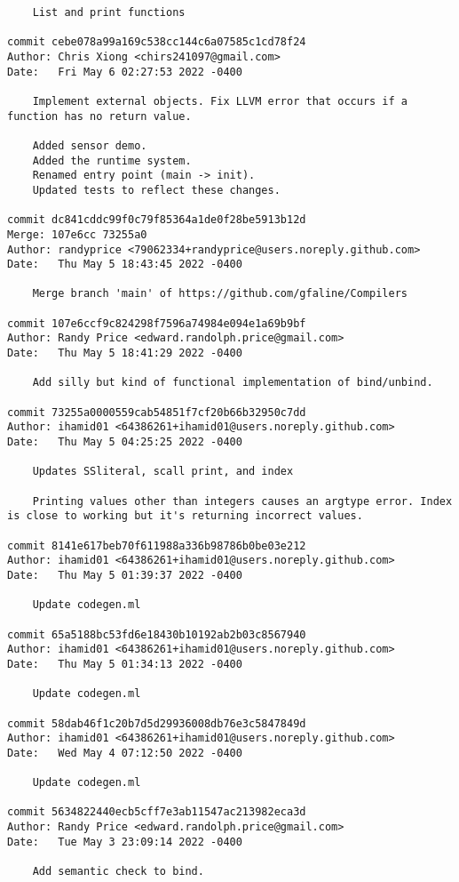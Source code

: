 {\begin{verbatim}
    List and print functions

commit cebe078a99a169c538cc144c6a07585c1cd78f24
Author: Chris Xiong <chirs241097@gmail.com>
Date:   Fri May 6 02:27:53 2022 -0400

    Implement external objects. Fix LLVM error that occurs if a function has no return value.
    
    Added sensor demo.
    Added the runtime system.
    Renamed entry point (main -> init).
    Updated tests to reflect these changes.

commit dc841cddc99f0c79f85364a1de0f28be5913b12d
Merge: 107e6cc 73255a0
Author: randyprice <79062334+randyprice@users.noreply.github.com>
Date:   Thu May 5 18:43:45 2022 -0400

    Merge branch 'main' of https://github.com/gfaline/Compilers

commit 107e6ccf9c824298f7596a74984e094e1a69b9bf
Author: Randy Price <edward.randolph.price@gmail.com>
Date:   Thu May 5 18:41:29 2022 -0400

    Add silly but kind of functional implementation of bind/unbind.

commit 73255a0000559cab54851f7cf20b66b32950c7dd
Author: ihamid01 <64386261+ihamid01@users.noreply.github.com>
Date:   Thu May 5 04:25:25 2022 -0400

    Updates SSliteral, scall print, and index
    
    Printing values other than integers causes an argtype error. Index is close to working but it's returning incorrect values.

commit 8141e617beb70f611988a336b98786b0be03e212
Author: ihamid01 <64386261+ihamid01@users.noreply.github.com>
Date:   Thu May 5 01:39:37 2022 -0400

    Update codegen.ml

commit 65a5188bc53fd6e18430b10192ab2b03c8567940
Author: ihamid01 <64386261+ihamid01@users.noreply.github.com>
Date:   Thu May 5 01:34:13 2022 -0400

    Update codegen.ml

commit 58dab46f1c20b7d5d29936008db76e3c5847849d
Author: ihamid01 <64386261+ihamid01@users.noreply.github.com>
Date:   Wed May 4 07:12:50 2022 -0400

    Update codegen.ml

commit 5634822440ecb5cff7e3ab11547ac213982eca3d
Author: Randy Price <edward.randolph.price@gmail.com>
Date:   Tue May 3 23:09:14 2022 -0400

    Add semantic check to bind.


\end{verbatim}}
